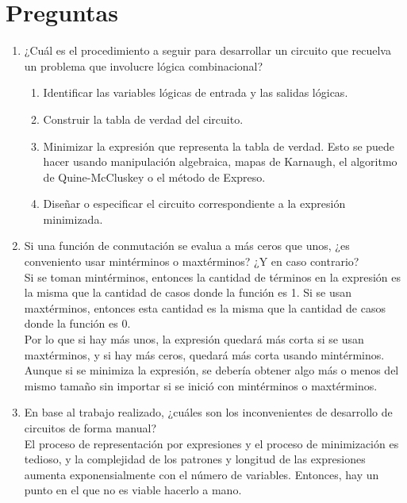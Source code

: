 \documentclass{article}
\begin{document}
    \section{Preguntas}

    \begin{enumerate}
        \item {
            ¿Cuál es el procedimiento a seguir para desarrollar un circuito que 
            recuelva un problema que involucre lógica combinacional?
            \begin{enumerate}
                \item {
                    Identificar las variables lógicas de entrada y las salidas 
                    lógicas.
                }
                \item {
                    Construir la tabla de verdad del circuito.
                }
                \item {
                    Minimizar la expresión que representa la tabla de verdad. 
                    Esto se puede hacer usando manipulación algebraica, mapas de 
                    Karnaugh, el algoritmo de Quine-McCluskey o el método de 
                    Expreso.
                }
                \item {
                    Diseñar o especificar el circuito correspondiente a la 
                    expresión minimizada.
                }
            \end{enumerate}
        }
        \item {
            Si una función de conmutación se evalua a más ceros que unos, ¿es
            conveniento usar mintérminos o maxtérminos? ¿Y en caso contrario? \\
            Si se toman mintérminos, entonces la cantidad de términos en la 
            expresión es la misma que la cantidad de casos donde la función es 1.
            Si se usan maxtérminos, entonces esta cantidad es la misma que la 
            cantidad de casos donde la función es 0. \\
            Por lo que si hay más unos, la expresión quedará más corta si se 
            usan maxtérminos, y si hay más ceros, quedará más corta usando 
            mintérminos. \\
            Aunque si se minimiza la expresión, se debería obtener algo más o 
            menos del mismo tamaño sin importar si se inició con mintérminos o 
            maxtérminos.
        }
        \item {
            En base al trabajo realizado, ¿cuáles son los inconvenientes de 
            desarrollo de circuitos de forma manual? \\
            El proceso de representación por expresiones y el proceso de 
            minimización es tedioso, y la complejidad de los patrones y longitud
            de las expresiones aumenta exponensialmente con el número de 
            variables. Entonces, hay un punto en el que no es viable hacerlo a 
            mano.
        }
    \end{enumerate}
\end{document}
